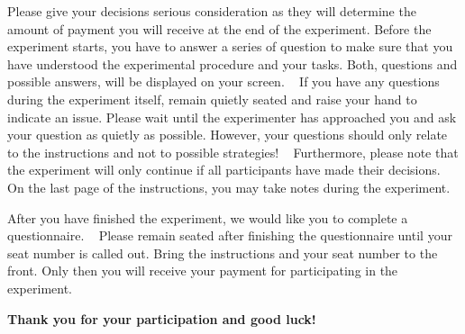 \documentclass[11pt]{article}
\begin{document}

Please give your decisions serious consideration as they will determine the amount of payment you will receive at the end of the experiment. Before the experiment starts, you have to answer a series of question to make sure that you have understood the experimental procedure and your tasks. Both, questions and possible answers, will be displayed on your screen. ~\bigbreak
If you have any questions during the experiment itself, remain quietly seated and raise your hand to indicate an issue. Please wait until the experimenter has approached you and ask your question as quietly as possible. However, your questions should only relate to the instructions and not to possible strategies! ~\bigbreak
Furthermore, please note that the experiment will only continue if all participants have made their decisions. ~\bigbreak
On the last page of the instructions, you may take notes during the experiment.


After you have finished the experiment, we would like you to complete a questionnaire. ~\bigbreak
Please remain seated after finishing the questionnaire until your seat number is called out. Bring the instructions and your seat number to the front. Only then you will receive your payment for participating in the experiment.

   \addvspace{1.5cm}
   
\textbf{Thank you for your participation and good luck!}
 
\end{document}
